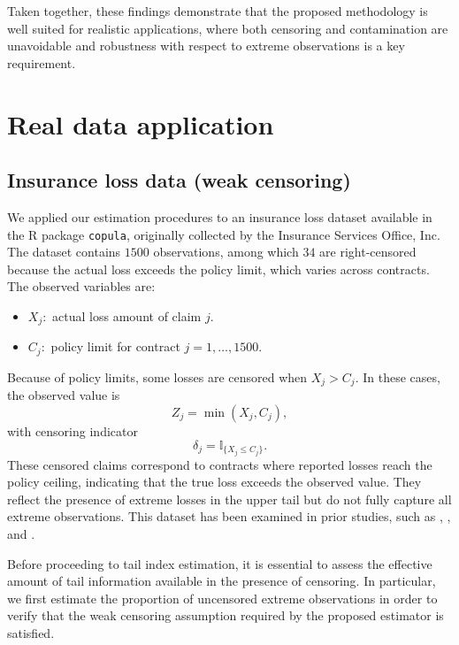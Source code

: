 \documentclass[reqno,openbib,runningheads,a4paper,12pt]{amsart}%
\begin{document}
\noindent Taken together, these findings demonstrate that the proposed
methodology is well suited for realistic applications, where both censoring
and contamination are unavoidable and robustness with respect to extreme
observations is a key requirement.

\section{\textbf{Real data application} \textbf{\label{sec5}}}

\subsection{Insurance loss data (weak censoring)}

\noindent We applied our estimation procedures to an insurance loss dataset
available in the R package \texttt{copula}, originally collected by the
Insurance Services Office, Inc. The dataset contains $1500$ observations,
among which $34$ are right-censored because the actual loss exceeds the policy
limit, which varies across contracts. The observed variables are:

\begin{itemize}
\item $X_{j}:$ actual loss amount of claim $j.$

\item $C_{j}:$ policy limit for contract $j=1,\dots,1500.$
\end{itemize}

\noindent Because of policy limits, some losses are censored when $X_{j}%
>C_{j}.$ In these cases, the observed value is
\[
Z_{j}=\min(X_{j},C_{j}),
\]
with censoring indicator
\[
\delta_{j}=\mathbb{I}_{\{X_{j}\leq C_{j}\}}.
\]
These censored claims correspond to contracts where reported losses reach the
policy ceiling, indicating that the true loss exceeds the observed value. They
reflect the presence of extreme losses in the upper tail but do not fully
capture all extreme observations. This dataset has been examined in prior
studies, such as \cite{FV98}, \cite{Klugman99}, and \cite{DPV06}.\smallskip

\noindent Before proceeding to tail index estimation, it is essential to
assess the effective amount of tail information available in the presence of
censoring. In particular, we first estimate the proportion of uncensored
extreme observations in order to verify that the weak censoring assumption
required by the proposed estimator is satisfied.
\end{document}
